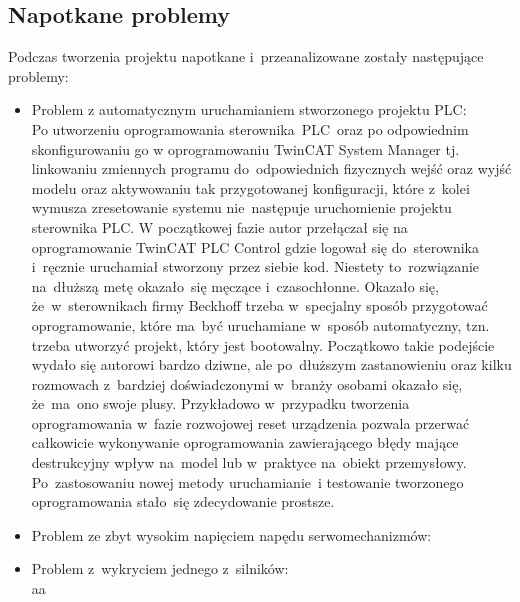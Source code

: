 \subsection{Napotkane problemy}
Podczas tworzenia projektu napotkane i~przeanalizowane zostały następujące problemy:
\begin{itemize}
\item Problem z automatycznym uruchamianiem stworzonego projektu PLC:\\[1mm]
Po utworzeniu oprogramowania sterownika~PLC~oraz po odpowiednim skonfigurowaniu go w oprogramowaniu TwinCAT System Manager tj. linkowaniu zmiennych programu do~odpowiednich fizycznych wejść oraz wyjść modelu oraz aktywowaniu tak przygotowanej konfiguracji, które z~kolei wymusza zresetowanie systemu nie~następuje uruchomienie projektu sterownika PLC. W początkowej fazie autor przełączał się na oprogramowanie TwinCAT PLC Control gdzie logował się do~sterownika i~ręcznie uruchamiał stworzony przez siebie kod. Niestety to~rozwiązanie na~dłuższą metę okazało~się męczące i~czasochłonne. Okazało się, że~w~sterownikach firmy Beckhoff trzeba w~specjalny sposób przygotować oprogramowanie, które ma~być uruchamiane w~sposób automatyczny, tzn. trzeba utworzyć projekt, który jest bootowalny. Początkowo takie podejście wydało się autorowi bardzo dziwne, ale po~dłuższym zastanowieniu oraz kilku rozmowach z~bardziej doświadczonymi w~branży osobami okazało się, że~ma~ono swoje plusy. Przykładowo w~przypadku tworzenia oprogramowania w~fazie rozwojowej reset urządzenia pozwala przerwać całkowicie wykonywanie oprogramowania zawierającego błędy mające destrukcyjny wpływ na~model lub w~praktyce na~obiekt przemysłowy. Po~zastosowaniu nowej metody uruchamianie~i testowanie tworzonego oprogramowania stało~się zdecydowanie prostsze.

\item Problem ze zbyt wysokim napięciem napędu serwomechanizmów:\\[1mm]

\item Problem z~wykryciem jednego z~silników:\\[1mm]
aa


\end{itemize}
